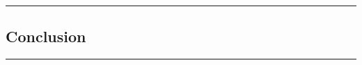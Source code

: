 {\color{gray}\hrule}
\begin{center}
\section{Conclusion}
\bigskip
\end{center}
{\color{gray}\hrule}

\begin{multicols}{2}
\end{multicols}
